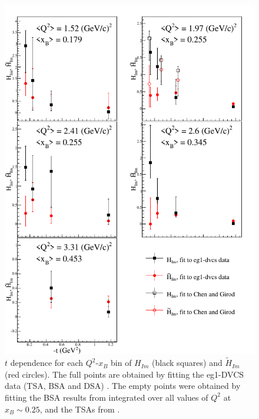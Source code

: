 \begin{figure}[tbph]
\begin{center}
\includegraphics[width=120mm]{CFF_comp_prop.pdf}
\caption[$t$ dependence of $H_{lm}$ and $\tilde{H}_{lm}$.]
{$t$ dependence for each $Q^2$-$x_B$ bin of $H_{Im}$ (black squares) and $\tilde{H}_{Im}$ (red circles). The full points are obtained by fitting the eg1-DVCS data (TSA, BSA and DSA) \cite{pisano}. The empty points were obtained by fitting the BSA results from \cite{fx} integrated over all values of $Q^2$ at $x_B \sim 0.25$, and the TSAs from \cite{shifeng}.}
\label{cffs_eg1dvcs}
\end{center}
\end{figure}
